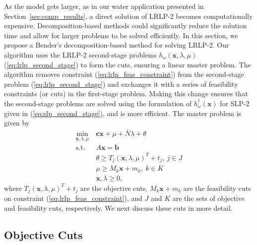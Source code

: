 \documentclass[11pt]{article}
\newcommand{\x}{\mathbf{x}}
\renewcommand{\c}{\mathbf{c}}
\renewcommand{\b}{\mathbf{b}}
\newcommand{\st}{\mbox{s.t.}}
\begin{document}
As the model gets larger, as in our water application presented in Section~\ref{sec:comp_results}, a direct solution of LRLP-2 becomes computationally expensive. 
Decomposition-based methods could significantly reduce the solution time and allow for larger problems to be solved efficiently. In this section, we propose a Bender's decomposition-based method for solving LRLP-2.
Our algorithm uses the LRLP-2 second-stage problems $h_\omega(\x,\lambda,\mu)$ (\ref{eq:lrlp_second_stage}) to form the cuts, ensuring a linear master problem.
The algorithm removes constraint (\ref{eq:lrlp_feas_constraint}) from the second-stage problem (\ref{eq:lrlp_second_stage}) and exchanges it with a series of feasibility constraints (or cuts) in the first-stage problem.
Making this change ensures that the second-stage problems are solved using the formulation of $h^\dagger_\omega(\x)$ for SLP-2 given in  (\ref{eq:slp_second_stage}), and is more efficient.
The master problem is given by
\begin{align}
	\min_{\x,\lambda,\mu} \ & \c\x + \mu + \bar{N}\lambda + \theta \label{eq:master_problem}\\
	\st \ & A\x = \b \nonumber \\
	& \theta \geq T_j (\x,\lambda,\mu)^T + t_j, \ j \in J \nonumber \\
	& \mu \geq M_k \x + m_k, \ k \in K \nonumber \\
	& \x,\lambda \geq 0, \nonumber
\end{align}
where $T_j (\x,\lambda,\mu)^T + t_j$ are the objective cuts, $M_k \x + m_k$ are the feasibility cuts on constraint (\ref{eq:lrlp_feas_constraint}), and $J$ and $K$ are the sets of objective and feasibility cuts, respectively.
We next discuss these cuts in more detail.

\subsection{Objective Cuts}
\end{document}
